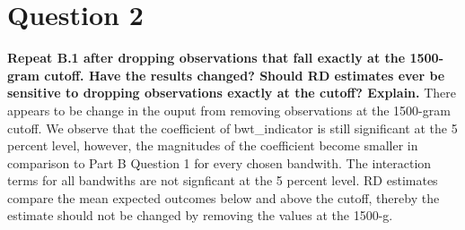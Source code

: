 \documentclass{article}
\begin{document}
\section*{Question 2}
\textbf{Repeat B.1 after dropping observations that fall exactly at the 1500-gram cutoff.  Have the results changed?  Should RD estimates ever be sensitive to dropping observations exactly at the cutoff? Explain.}
\newline \newline
There appears to be change in the ouput from removing observations at the 1500-gram cutoff. We observe that the coefficient of bwt\_indicator is still significant at the 5 percent level, however, the magnitudes of the coefficient become smaller in comparison to Part B Question 1 for every chosen bandwith. The interaction terms for all bandwiths are not signficant at the 5 percent level. RD estimates compare the mean expected outcomes below and above the cutoff, thereby the estimate should not be changed by removing the values at the 1500-g.
\end{document}
